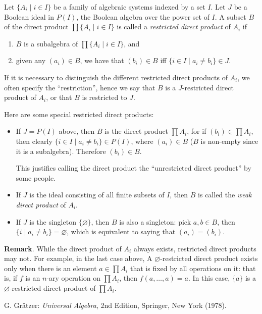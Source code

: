\documentclass[12pt]{article}
\begin{document}
Let $\lbrace A_i\mid i\in I\rbrace$ be a family of algebraic systems indexed by a set $I$.  Let $J$ be a Boolean ideal in $P(I)$, the Boolean algebra over the power set of $I$.  A subset $B$ of the direct product $\prod \lbrace A_i\mid i\in I\rbrace$ is called a \emph{restricted direct product} of $A_i$ if
\begin{enumerate}
\item $B$ is a subalgebra of $\prod \lbrace A_i\mid i\in I\rbrace$, and
\item given any $(a_i)\in B$, we have that $(b_i)\in B$ iff $\lbrace i\in I\mid a_i\ne b_i\rbrace \in J$.
\end{enumerate}
If it is necessary to distinguish the different restricted direct products of $A_i$, we often specify the ``restriction'', hence we say that $B$ is a $J$-restricted direct product of $A_i$, or that $B$ is restricted to $J$.

Here are some special restricted direct products:
\begin{itemize}
\item
If $J=P(I)$ above, then $B$ is the direct product $\prod A_i$, for if $(b_i)\in \prod A_i$, then clearly $\lbrace i\in I\mid a_i\ne b_i\rbrace\in P(I)$, where $(a_i)\in B$ ($B$ is non-empty since it is a subalgebra).  Therefore $(b_i)\in B$.

This justifies calling the direct product the ``unrestricted direct product'' by some people.
\item
If $J$ is the ideal consisting of all finite subsets of $I$, then $B$ is called the \emph{weak direct product} of $A_i$.
\item
If $J$ is the singleton $\lbrace \varnothing\rbrace$, then $B$ is also a singleton: pick $a,b\in B$, then $\lbrace i\mid a_i\ne b_i\rbrace = \varnothing$, which is equivalent to saying that $(a_i)=(b_i)$.
\end{itemize}

\textbf{Remark}.  While the direct product of $A_i$ always exists, restricted direct products may not.  For example, in the last case above, A $\varnothing$-restricted direct product exists only when there is an element $a\in \prod A_i$ that is fixed by all operations on it: that is, if $f$ is an $n$-ary operation on $\prod A_i$, then $f(a,\ldots,a)=a$.  In this case, $\lbrace a\rbrace$ is a $\varnothing$-restricted direct product of $\prod A_i$.

\begin{thebibliography}{6}
 G. Gr\"{a}tzer: {\em Universal Algebra}, 2nd Edition, Springer, New York (1978).
\end{thebibliography}
\end{document}
